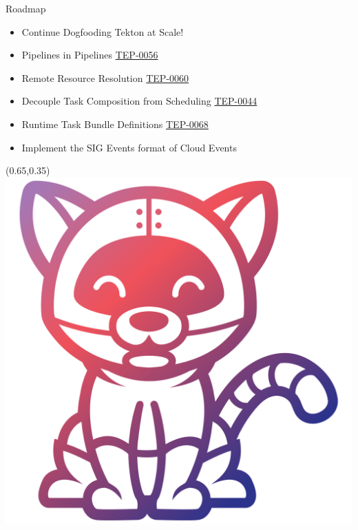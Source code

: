 \documentclass[aspectratio=169,11pt,hyperref={colorlinks=true}]{beamer}
\begin{document}
{
\begin{tblackbgrayframe}{Roadmap}
  \begin{itemize}
    \item Continue Dogfooding Tekton at Scale!
    \item Pipelines in Pipelines \href{https://github.com/tektoncd/community/blob/main/teps/0056-pipelines-in-pipelines.md}{TEP-0056}
    \item Remote Resource Resolution \href{https://github.com/tektoncd/community/blob/main/teps/0060-remote-resource-resolution.md}{TEP-0060}
    \item Decouple Task Composition from Scheduling \href{https://github.com/tektoncd/community/blob/main/teps/0044-decouple-task-composition-from-scheduling.md}{TEP-0044}
    \item Runtime Task Bundle Definitions \href{https://github.com/tektoncd/community/pull/429}{TEP-0068}
    \item Implement the SIG Events format of Cloud Events
  \end{itemize}
  \begin{textblock*}{0.28\paperwidth}(0.65\paperwidth,0.35\paperheight)
    \includegraphics[width=0.28\paperwidth]{img/tekton-icon-color.png}
  \end{textblock*}
\end{tblackbgrayframe}
}
\end{document}
